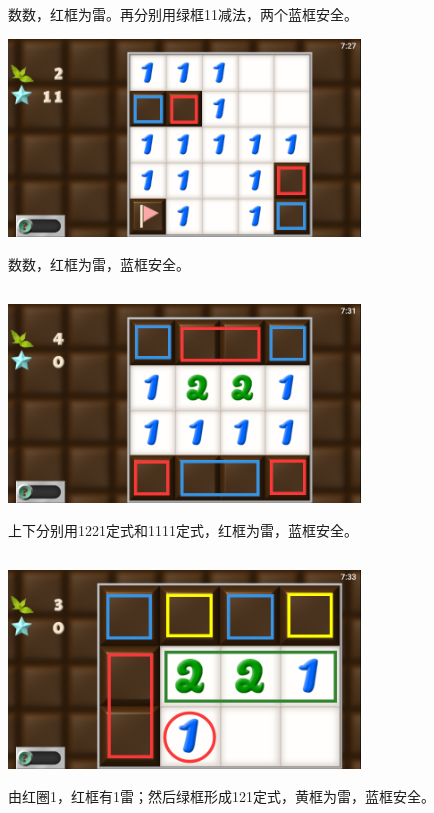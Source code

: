 数数，红框为雷。再分别用绿框11减法，两个蓝框安全。
\begin{center}
    \includegraphics[width=0.7\textwidth]{puzzle/5-5.png}
\end{center}
数数，红框为雷，蓝框安全。

\subsection{} %
\begin{center}
    \includegraphics[width=0.7\textwidth]{puzzle/6-1.png}
\end{center}
上下分别用1221定式和1111定式，红框为雷，蓝框安全。

\subsection{} %
\begin{center}
    \includegraphics[width=0.7\textwidth]{puzzle/7-1.png}
\end{center}
由红圈1，红框有1雷；然后绿框形成121定式，黄框为雷，蓝框安全。


